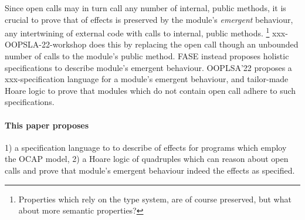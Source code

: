 Since open calls may in turn call any number of internal, public methods, 
it is crucial  to prove that \taming of effects is preserved by the module's 
\emph{emergent} behaviour, \ie any intertwining of external code with calls to internal, public methods.
\footnote{Properties which rely on the type system, are of course preserved, but what about more semantic properties?}
xxx-OOPSLA-22-workshop does this by replacing the open call though an unbounded number of calls to the module's public method.
 FASE instead proposes holistic specifications to describe   module's emergent behaviour. 
 OOPLSA'22 proposes a xxx-specification language for a module's emergent behaviour, and  tailor-made Hoare logic to prove that modules which do not contain open call adhere to such specifications.




\paragraph{This paper proposes} %
1) a specification language to to describe  \taming of effects for  programs which employ the OCAP model, 
 2)  a Hoare logic of quadruples which can reason about open calls and prove that module's emergent behaviour indeed \tames the effects as specified.

